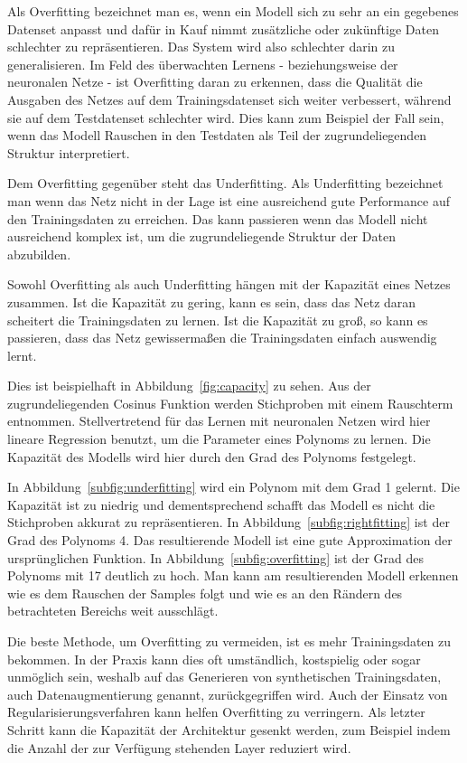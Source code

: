 Als Overfitting bezeichnet man es, wenn ein Modell sich zu sehr an ein gegebenes Datenset anpasst und 
dafür in Kauf nimmt zusätzliche oder zukünftige Daten schlechter zu repräsentieren.
Das System wird also schlechter darin zu generalisieren.
Im Feld des überwachten Lernens - beziehungsweise der neuronalen Netze - ist Overfitting daran zu erkennen,
dass die Qualität die Ausgaben des Netzes auf dem Trainingsdatenset sich weiter verbessert,
während sie auf dem Testdatenset schlechter wird.
Dies kann zum Beispiel der Fall sein, wenn das Modell Rauschen in den Testdaten als Teil der zugrundeliegenden Struktur interpretiert. 


Dem Overfitting gegenüber steht das Underfitting. 
Als Underfitting bezeichnet man wenn das Netz nicht in der Lage ist
eine ausreichend gute Performance auf den Trainingsdaten zu erreichen.
Das kann passieren wenn das Modell nicht ausreichend komplex ist, um die zugrundeliegende Struktur der Daten abzubilden.


Sowohl Overfitting als auch Underfitting hängen mit der Kapazität eines Netzes zusammen.
Ist die Kapazität zu gering, kann es sein, dass das Netz daran scheitert die Trainingsdaten zu lernen.
Ist die Kapazität zu groß, so kann es passieren, dass das Netz gewissermaßen die Trainingsdaten einfach auswendig lernt.

Dies ist beispielhaft in Abbildung~\ref{fig:capacity} zu sehen.
Aus der zugrundeliegenden Cosinus Funktion werden Stichproben mit einem Rauschterm entnommen. 
Stellvertretend für das Lernen mit neuronalen Netzen wird hier lineare Regression benutzt,
um die Parameter eines Polynoms zu lernen.
Die Kapazität des Modells wird hier durch den Grad des Polynoms festgelegt.

In Abbildung~\ref{subfig:underfitting} wird ein Polynom mit dem Grad 1 gelernt.
Die Kapazität ist zu niedrig und dementsprechend schafft das Modell es nicht die Stichproben akkurat zu repräsentieren.
In Abbildung~\ref{subfig:rightfitting} ist der Grad des Polynoms 4.
Das resultierende Modell ist eine gute Approximation der ursprünglichen Funktion.
In Abbildung~\ref{subfig:overfitting} ist der Grad des Polynoms mit 17 deutlich zu hoch.
Man kann am resultierenden Modell erkennen wie es dem Rauschen der Samples folgt und wie es an den Rändern des betrachteten Bereichs weit ausschlägt.

Die beste Methode, um Overfitting zu vermeiden, ist es mehr Trainingsdaten zu bekommen.
In der Praxis kann dies oft umständlich, kostspielig oder sogar unmöglich sein, 
weshalb auf das Generieren von synthetischen Trainingsdaten, auch Datenaugmentierung genannt, zurückgegriffen wird.
Auch der Einsatz von Regularisierungsverfahren kann helfen Overfitting zu verringern.
Als letzter Schritt kann die Kapazität der Architektur gesenkt werden,
zum Beispiel indem die Anzahl der zur Verfügung stehenden Layer reduziert wird.


